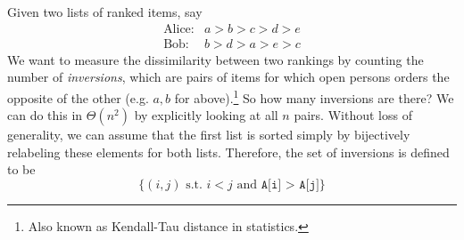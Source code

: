 \documentclass{article}
\begin{document}
    \begin{definition}[Inversions]
      Given two lists of ranked items, say 
      \begin{align}
        \text{Alice}: & a > b > c > d > e \\
        \text{Bob}: & b > d > a > e > c
      \end{align}
      We want to measure the dissimilarity between two rankings by counting the number of \textit{inversions}, which are pairs of items for which open persons orders the opposite of the other (e.g. $a, b$ for above).\footnote{Also known as Kendall-Tau distance in statistics.} So how many inversions are there? We can do this in $\Theta(n^2)$ by explicitly looking at all $n$ pairs. Without loss of generality, we can assume that the first list is sorted simply by bijectively relabeling these elements for both lists. Therefore, the set of inversions is defined to be 
      \begin{equation}
        \{(i, j) \text{ s.t. } i < j \text{ and } \texttt{A[i] > A[j]}\}
      \end{equation}
    \end{definition}
\end{document}
